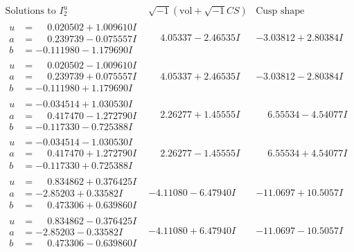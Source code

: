 \documentclass[1p]{elsarticle_modified}
\theoremstyle{definition}
\newcommand{\I}{\sqrt{-1}}
\begin{document}
$$\begin{array}{c|c|c}  
\text{Solutions to }I^u_{2}& \I (\text{vol} + \sqrt{-1}CS) & \text{Cusp shape}\\
 \hline 
\begin{aligned}
u &= \phantom{-}0.020502 + 1.009610 I \\
a &= \phantom{-}0.239739 - 0.075557 I \\
b &= -0.111980 - 1.179690 I\end{aligned}
 & \phantom{-}4.05337 - 2.46535 I & -3.03812 + 2.80384 I \\ \hline\begin{aligned}
u &= \phantom{-}0.020502 - 1.009610 I \\
a &= \phantom{-}0.239739 + 0.075557 I \\
b &= -0.111980 + 1.179690 I\end{aligned}
 & \phantom{-}4.05337 + 2.46535 I & -3.03812 - 2.80384 I \\ \hline\begin{aligned}
u &= -0.034514 + 1.030530 I \\
a &= \phantom{-}0.417470 - 1.272790 I \\
b &= -0.117330 - 0.725388 I\end{aligned}
 & \phantom{-}2.26277 + 1.45555 I & \phantom{-}6.55534 - 4.54077 I \\ \hline\begin{aligned}
u &= -0.034514 - 1.030530 I \\
a &= \phantom{-}0.417470 + 1.272790 I \\
b &= -0.117330 + 0.725388 I\end{aligned}
 & \phantom{-}2.26277 - 1.45555 I & \phantom{-}6.55534 + 4.54077 I \\ \hline\begin{aligned}
u &= \phantom{-}0.834862 + 0.376425 I \\
a &= -2.85203 + 0.33582 I \\
b &= \phantom{-}0.473306 + 0.639860 I\end{aligned}
 & -4.11080 - 6.47940 I & -11.0697 + 10.5057 I \\ \hline\begin{aligned}
u &= \phantom{-}0.834862 - 0.376425 I \\
a &= -2.85203 - 0.33582 I \\
b &= \phantom{-}0.473306 - 0.639860 I\end{aligned}
 & -4.11080 + 6.47940 I & -11.0697 - 10.5057 I \\ \hline\begin{aligned}

\end{aligned}
\end{array}$$
\end{document}
